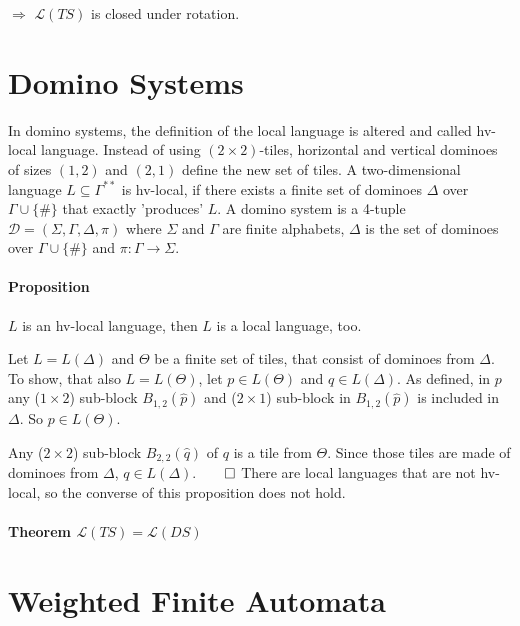 \documentclass{article}
\begin{document}
$\Rightarrow$ $\mathcal{L}(TS)$ is closed under rotation.

\section{Domino Systems}
In domino systems, the definition of the local language is altered and called hv-local language. Instead of using $(2\times2)$-tiles, horizontal and vertical dominoes of sizes $(1,2)$ and $(2,1)$ define the new set of tiles. A two-dimensional language $L \subseteq \Gamma^{**}$ is hv-local, if there exists a finite set of dominoes $\Delta$ over $\Gamma \cup \{\#\}$ that exactly 'produces' $L$. 
A domino system is a 4-tuple $\mathcal{D}=(\Sigma, \Gamma, \Delta, \pi)$ where $\Sigma$ and $\Gamma$ are finite alphabets, $\Delta$ is the set of dominoes over $\Gamma \cup \{\#\}$ and $\pi: \Gamma \rightarrow \Sigma$. 

\paragraph{Proposition} $L$ is an hv-local language, then $L$ is a local language, too. 

Let $L=L(\Delta)$ and $\Theta$ be a finite set of tiles, that consist of dominoes from $\Delta$. To show, that also $L=L(\Theta)$, let $p\in L(\Theta)$ and $q \in L(\Delta)$. As defined, in $p$ any ($1\times2$) sub-block $B_{1,2}(\widehat{p})$ and ($2\times1$) sub-block in $B_{1,2}(\widehat{p})$ is included in $\Delta$. So $p \in L(\Theta)$.

Any ($2\times2$) sub-block $B_{2,2}(\widehat{q})$ of $q$ is a tile from $\Theta$. Since those tiles are made of dominoes from $\Delta$, $q \in L(\Delta)$.$\qed$ \newline
There are local languages that are not hv-local, so the converse of this proposition does not hold.

\paragraph{Theorem $\mathcal{L}(TS) = \mathcal{L}(DS)$}











\section{Weighted Finite Automata}
\end{document}
